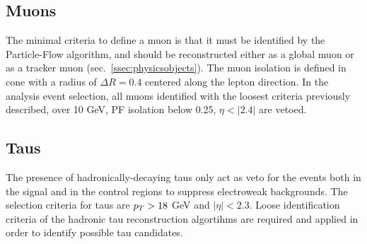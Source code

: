 
\subsection{Muons}\label{ssec:muons}


The minimal criteria to define a muon is that it must be identified by the Particle-Flow algorithm, and should be reconstructed either as a global muon or as a tracker muon (sec.~\ref{ssec:physicsobjects}). The muon isolation is defined in cone with a radius of $\Delta R=0.4$ centered along the lepton direction. In the analysis event selection, all muons identified with the loosest criteria previously described, \pt over 10 GeV, PF isolation below 0.25, $\eta<|2.4|$ are vetoed.
 


\subsection{Taus}\label{sec:tau}
The presence of hadronically-decaying taus only act as veto for the events both in the signal and in the control regions to suppress electroweak backgrounds. The selection criteria for taus are $p_T > 18$ GeV and $|\eta| < 2.3$. Loose identification criteria of the hadronic tau reconstruction algortihms are required and applied in order to identify possible tau candidates.


